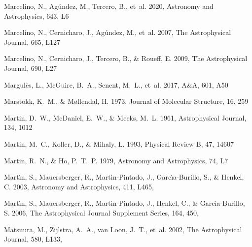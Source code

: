 \documentclass[twocolumn]{aastex631}
\begin{document}
\begin{thebibliography}{}
Marcelino, N., Ag{\'u}ndez, M., Tercero, B., {et~al.} 2020, Astronomy and
  Astrophysics, 643, L6

Marcelino, N., Cernicharo, J., Ag{\'u}ndez, M., {et~al.} 2007, The
  Astrophysical Journal, 665, L127

Marcelino, N., Cernicharo, J., Tercero, B., \& Roueff, E. 2009, The
  Astrophysical Journal, 690, L27

Margul{\`e}s, L., McGuire, B.~A., Senent, M.~L., {et~al.} 2017, A{\&}A, 601,
  A50

Marstokk, K.~M., \& M{\o}llendal, H. 1973, Journal of Molecular Structure, 16,
  259

Martin, D.~W., McDaniel, E.~W., \& Meeks, M.~L. 1961, Astrophysical Journal,
  134, 1012

Martin, M.~C., Koller, D., \& Mihaly, L. 1993, Physical Review B, 47, 14607

{Martin}, R.~N., \& {Ho}, P.~T.~P. 1979, Astronomy and Astrophysics, 74, L7

{Mart{\'\i}n}, S., {Mauersberger}, R., {Mart{\'\i}n-Pintado}, J.,
  {Garc{\'\i}a-Burillo}, S., \& {Henkel}, C. 2003, Astronomy and Astrophysics,
  411, L465, 

{Mart{\'\i}n}, S., {Mauersberger}, R., {Mart{\'\i}n-Pintado}, J., {Henkel}, C.,
  \& {Garc{\'\i}a-Burillo}, S. 2006, The Astrophysical Journal Supplement
  Series, 164, 450, 

{Matsuura}, M., {Zijlstra}, A.~A., {van Loon}, J.~T., {et~al.} 2002, The
  Astrophysical Journal, 580, L133, 


\end{thebibliography}
\end{document}
